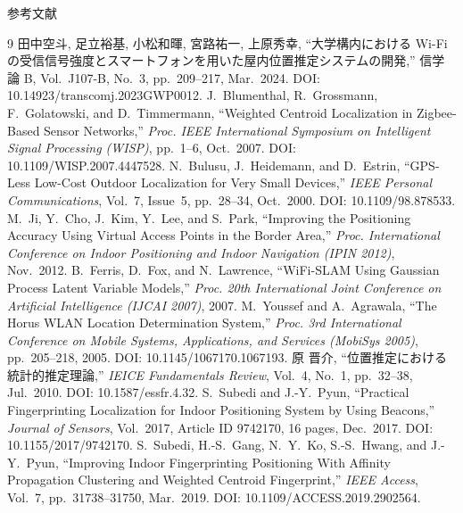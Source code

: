 \documentclass[aspectratio=169,unicode,10pt]{beamer}
\begin{document}
\begin{frame}[allowframebreaks]{参考文献}
\begin{thebibliography}{9}\footnotesize
    田中空斗, 足立裕基, 小松和暉, 宮路祐一, 上原秀幸,
    ``大学構内における Wi-Fi の受信信号強度とスマートフォンを用いた屋内位置推定システムの開発,''
    信学論 B, Vol.~J107-B, No.~3, pp.~209--217, Mar.~2024.
    DOI: 10.14923/transcomj.2023GWP0012.
    J.~Blumenthal, R.~Grossmann, F.~Golatowski, and D.~Timmermann,
    ``Weighted Centroid Localization in Zigbee-Based Sensor Networks,''
    \emph{Proc. IEEE International Symposium on Intelligent Signal Processing (WISP)}, pp.~1--6, Oct.~2007.
    DOI: 10.1109/WISP.2007.4447528.
    N.~Bulusu, J.~Heidemann, and D.~Estrin,
    ``GPS-Less Low-Cost Outdoor Localization for Very Small Devices,''
    \emph{IEEE Personal Communications}, Vol.~7, Issue~5, pp.~28--34, Oct.~2000.
    DOI: 10.1109/98.878533.
    M.~Ji, Y.~Cho, J.~Kim, Y.~Lee, and S.~Park,
    ``Improving the Positioning Accuracy Using Virtual Access Points in the Border Area,''
    \emph{Proc. International Conference on Indoor Positioning and Indoor Navigation (IPIN 2012)}, Nov.~2012.
    B.~Ferris, D.~Fox, and N.~Lawrence,
    ``WiFi-SLAM Using Gaussian Process Latent Variable Models,''
    \emph{Proc. 20th International Joint Conference on Artificial Intelligence (IJCAI 2007)}, 2007.
    M.~Youssef and A.~Agrawala,
    ``The Horus WLAN Location Determination System,''
    \emph{Proc. 3rd International Conference on Mobile Systems, Applications, and Services (MobiSys 2005)}, pp.~205--218, 2005.
    DOI: 10.1145/1067170.1067193.
    原 晋介,
    ``位置推定における統計的推定理論,''
    \emph{IEICE Fundamentals Review}, Vol.~4, No.~1, pp.~32--38, Jul.~2010.
    DOI: 10.1587/essfr.4.32.
    S.~Subedi and J.-Y.~Pyun,
    ``Practical Fingerprinting Localization for Indoor Positioning System by Using Beacons,''
    \emph{Journal of Sensors}, Vol.~2017, Article ID 9742170, 16 pages, Dec.~2017.
    DOI: 10.1155/2017/9742170.
    S.~Subedi, H.-S.~Gang, N.~Y.~Ko, S.-S.~Hwang, and J.-Y.~Pyun,
    ``Improving Indoor Fingerprinting Positioning With Affinity Propagation Clustering and Weighted Centroid Fingerprint,''
    \emph{IEEE Access}, Vol.~7, pp.~31738--31750, Mar.~2019.
    DOI: 10.1109/ACCESS.2019.2902564.
\end{thebibliography}
\end{frame}
\end{document}

